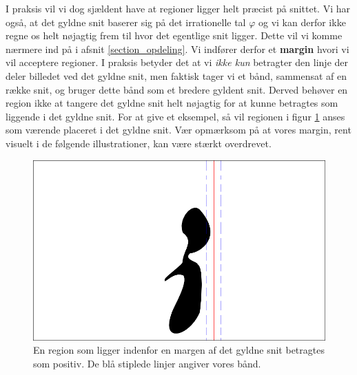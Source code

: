 {I praksis vil vi dog sjældent have at regioner ligger helt præcist på
snittet.
Vi har også, at det gyldne snit baserer sig på det irrationelle tal
$\varphi$ og vi kan derfor ikke regne os helt nøjagtig frem til hvor det
egentlige snit ligger. Dette vil vi komme nærmere ind på i afsnit
\ref{section_opdeling}. Vi indfører derfor et \textbf{margin} hvori vi vil
acceptere regioner.  I praksis betyder det at vi \emph{ikke kun}
betragter den linje der deler billedet ved det gyldne snit, men faktisk
tager vi et bånd, sammensat af en række snit, og bruger dette bånd som
et bredere gyldent snit.  Derved behøver en region ikke at tangere det
gyldne snit helt nøjagtig for at kunne betragtes som liggende i det
gyldne snit. For at give et eksempel, så vil regionen i figur
\ref{pos_naiv_margin_1} anses som værende placeret i det gyldne snit.
Vær opmærksom på at vores margin, rent visuelt i de følgende
illustrationer, kan være stærkt overdrevet.
\begin{figure}[h]
    \begin{center}
        \includegraphics[scale=\imgscale,angle=0]{afsnit/vores_implementation/billeder/naiv_algoritme/naiv_positiv_blob_margin_1}
    \end{center}
    \caption[Positiv region i margen]{En region som
    ligger indenfor en margen af det gyldne snit betragtes som
    positiv. De blå stiplede linjer angiver vores bånd.}
    \label{pos_naiv_margin_1}
\end{figure}

}
